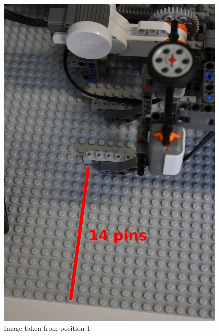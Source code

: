 \documentclass[%
  a4paper,%
  11pt,%
  blue,%
  hyperref	%
  ]{tubsartcl}
\begin{document}
\begin{figure}[!htb]
\begin{center}
\includegraphics[scale=0.4]{graphics/1.jpg}
\end{center}
\caption{Image taken from position 1}
\end{figure}
\end{document}
